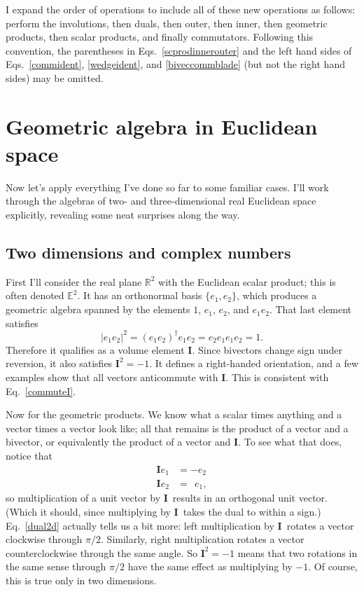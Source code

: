 \documentclass{utarticle}
\newcommand{\bl}[1]{\ensuremath{\bm{#1}}}
\newcommand{\I}{\bl{I}}
\newcommand{\rev}[1]{\ensuremath{#1^\dagger}}
\begin{document}
I expand the order of operations to include all of these new operations as follows: 
perform the involutions, then duals, then outer, then inner, then geometric products, 
then scalar products, and finally commutators.  Following this convention, the parentheses 
in Eqs.~\eqref{scprodinnerouter} and the left hand sides of Eqs.~\eqref{commident}, 
\eqref{wedgeident}, and \eqref{biveccommblade} (but not the right hand sides) may be omitted.

\section{Geometric algebra in Euclidean space}
\label{eucl}

Now let's apply everything I've done so far to some familiar cases.  I'll work through 
the algebras of two- and three-dimensional real Euclidean space explicitly, revealing 
some neat surprises along the way.

\subsection{Two dimensions and complex numbers}
\label{2d}

First I'll consider the real plane $\mathbb{R}^2$ with the
Euclidean scalar product; this is often denoted $\mathbb{E}^2$.  It
has an orthonormal basis $\{e_1, e_2\}$, which produces a
geometric algebra spanned by the elements $1$, $e_1$, $e_2$, and $e_1
e_2$.  That last element satisfies
\begin{equation}
|e_1 e_2|^2 = \rev{(e_1 e_2)} e_1 e_2 = e_2 e_1 e_1 e_2 = 1.
\end{equation}
Therefore it qualifies as a volume element \I.  Since bivectors change sign under 
reversion, it also satisfies $\I^2=-1$.  It defines a right-handed orientation, and 
a few examples show that all vectors anticommute with \I.  This is consistent with 
Eq.~\eqref{commuteI}.

Now for the geometric products.  We know what a scalar times anything and a 
vector times a vector look like; all that remains is the product of a vector and a 
bivector, or equivalently the product of a vector and \I.  To see what that does, 
notice that
\begin{align} 
\I e_1 & = -e_2 \nonumber \\
\I e_2 & = \ \ e_1, 
\label{dual2d} 
\end{align}
so multiplication of a unit vector by \I\ results in an orthogonal
unit vector.  (Which it should, since multiplying by \I\ takes the dual to 
within a sign.)  Eq.~\eqref{dual2d} actually tells us a bit more: left
multiplication by \I\ rotates a vector clockwise through $\pi/2$.
Similarly, right multiplication rotates a vector counterclockwise
through the same angle.  So $\I^2=-1$ means that two rotations in the
same sense through $\pi/2$ have the same effect as multiplying by
$-1$.  Of course, this is true only in two dimensions.
\end{document}
